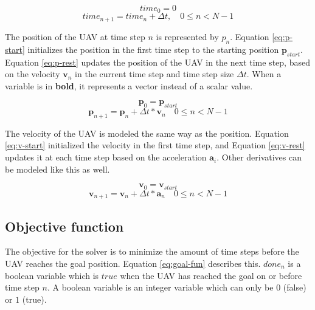 \begin{equation}
\label{eq:t-start}
time_0 = 0
\end{equation}
\begin{equation}
\label{eq:t-rest}
time_{n+1} = time_{n} + \Delta t,  \quad 0 \leq n < N - 1
\end{equation}

The position of the UAV at time step $n$ is represented by $p_n$. Equation \ref{eq:p-start} initializes the position in the first time step to the starting position $\boldsymbol{p}_{start}$. Equation \ref{eq:p-rest} updates the position of the UAV in the next time step, based on the velocity $\boldsymbol{v}_n$ in the current time step and time step size $\Delta t$. When a variable is in \textbf{bold}, it represents a vector instead of a scalar value.

\begin{equation}
\label{eq:p-start}
\boldsymbol{p}_0 = \boldsymbol{p}_{start}
\end{equation}
\begin{equation}
\label{eq:p-rest}
\boldsymbol{p}_{n+1} = \boldsymbol{p}_{n} + \Delta t * \boldsymbol{v}_{n}  \quad 0 \leq n < N - 1
\end{equation}

The velocity of the UAV is modeled the same way as the position. Equation \ref{eq:v-start} initialized the velocity in the first time step, and Equation \ref{eq:v-rest} updates it at each time step based on the acceleration $\boldsymbol{a}_i$. Other derivatives can be modeled like this as well.

\begin{equation}
\label{eq:v-start}
\boldsymbol{v}_0 =\boldsymbol{v}_{start}
\end{equation}
\begin{equation}
\label{eq:v-rest}
\boldsymbol{v}_{n+1} =\boldsymbol{v}_{n} + \Delta t * \boldsymbol{a}_{n}  \quad 0 \leq n < N - 1
\end{equation}

\subsection{Objective function}
\label{subsec:obj-fun}
The objective for the solver is to minimize the amount of time steps before the UAV reaches the goal position. Equation \ref{eq:goal-fun} describes this. $done_n$ is a boolean variable which is $true$ when the UAV has reached the goal on or before time step $n$. A boolean variable is an integer variable which can only be $0$ (false) or $1$ (true).


